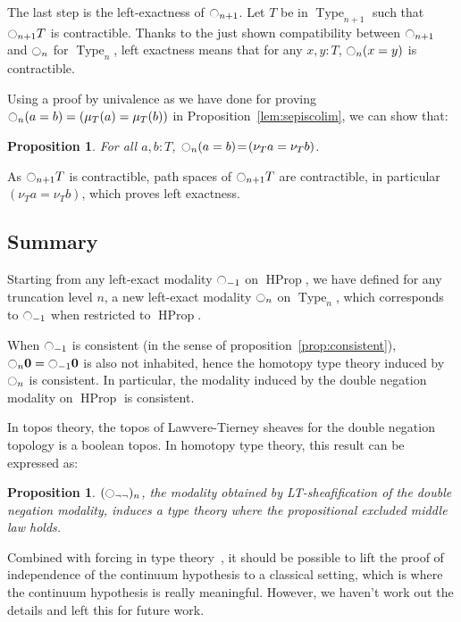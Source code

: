 \documentclass[preprint,9pt,numbers]{sigplanconf}
\newtheorem{prop}[thm]{Proposition}
\DeclareMathOperator{\Type}{Type}
\DeclareMathOperator{\HProp}{HProp}
\newcommand{\modal}{\ensuremath{\ocircle}}
\newcommand \zero {\mathbf{0}}
\begin{document}
The last step is the left-exactness of $\modal_{n+1}$. Let $T$ be in
$\Type_{n+1}$ such that $\modal_{n+1} T$ is contractible.  Thanks to the just
shown compatibility between $\modal_{n+1}$ and $\modal_n$ for
$\Type_n$, left exactness means that for any $x,y: T$,
$\modal_n(x=y)$ is contractible.

Using a proof by univalence as we have done for proving $\modal_n (a=b) = (\mu_T(a) =
\mu_T (b))$ in Proposition~\ref{lem:sepiscolim}, we can show that:
\begin{prop}
  For all $a,b:T$, $\modal_n(a=b) \!=\! (\nu_T a = \nu_T b)$.
\end{prop}

As $\modal_{n+1} T$ is contractible, path spaces of $\modal_{n+1} T$ are
contractible, in particular $(\nu_T a=\nu_T b)$, which proves left
exactness.

\subsection{Summary}
\label{ssec:summary}

Starting from any left-exact modality $\modal_{-1}$ on $\HProp$, we
have defined for any truncation level $n$, a new left-exact modality
$\modal_n$ on $\Type_n$, which corresponds to $\modal_{-1}$ when
restricted to $\HProp$.


When $\modal_{-1}$ is consistent (in the sense of
proposition~\ref{prop:consistent}), 
$\modal_{n}\zero=\modal_{-1}\zero$ is also not inhabited, hence the homotopy type theory induced by
$\modal_n$ is consistent. 
%
In particular, the modality induced by the double negation modality on
$\HProp$ is consistent.

In topos theory, the topos of Lawvere-Tierney sheaves for the double
negation topology is a boolean topos. In homotopy type theory, this
result can be expressed as:

\begin{prop}
  $(\modal_{\lnot\lnot})_n$, the modality obtained by LT-sheafifica\-tion
  of the double negation modality,
  induces a type theory where the propositional excluded middle law holds.
\end{prop}

Combined with forcing in type theory~\cite{jaber2012extending}, it
should be possible to lift the proof of independence of the continuum
hypothesis to a classical setting, which is where the continuum hypothesis is
really meaningful.  However, we haven't work out the details and left
this for future work.
\end{document}
